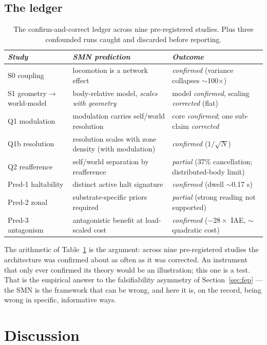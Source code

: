 \documentclass[utf8]{FrontiersinHarvard} %
\begin{document}
\subsection{The ledger}\label{sec:ledger-table}
\begin{table}[ht]
\centering
\begin{tabular}{p{3.2cm} p{5.2cm} p{5.2cm}}
\hline
\emph{Study} & \emph{SMN prediction} & \emph{Outcome} \\
\hline
S0 coupling & locomotion is a network effect & \emph{confirmed} (variance collapses $\sim$100$\times$) \\
S1 geometry$\to$world-model & body-relative model, \emph{scales with geometry} & model \emph{confirmed}, scaling \emph{corrected} (flat) \\
Q1 modulation & modulation carries self/world resolution & core \emph{confirmed}; one sub-claim \emph{corrected} \\
Q1b resolution & resolution scales with zone density (with modulation) & \emph{confirmed} ($1/\sqrt N$) \\
Q2 reafference & self/world separation by reafference & \emph{partial} (37\% cancellation; distributed-body limit) \\
Pred-1 haltability & distinct active halt signature & \emph{confirmed} (dwell $\sim$0.17 s) \\
Pred-2 zonal & substrate-specific priors required & \emph{partial} (strong reading not supported) \\
Pred-3 antagonism & antagonistic benefit at load-scaled cost & \emph{confirmed} ($-28\times$ IAE, $\sim$quadratic cost) \\
\hline
\end{tabular}
\caption{The confirm-and-correct ledger across nine pre-registered studies. Plus three confounded runs caught and discarded before reporting.}
\label{tab:ledger}
\end{table}

The arithmetic of Table~\ref{tab:ledger} is the argument: across nine pre-registered studies the architecture was confirmed about as often as it was corrected. An instrument that only ever confirmed its theory would be an illustration; this one is a test. That is the empirical answer to the falsifiability asymmetry of Section~\ref{sec:fep} --- the SMN is the framework that can be wrong, and here it is, on the record, being wrong in specific, informative ways.

\section{Discussion}\label{sec:discussion}
\end{document}
